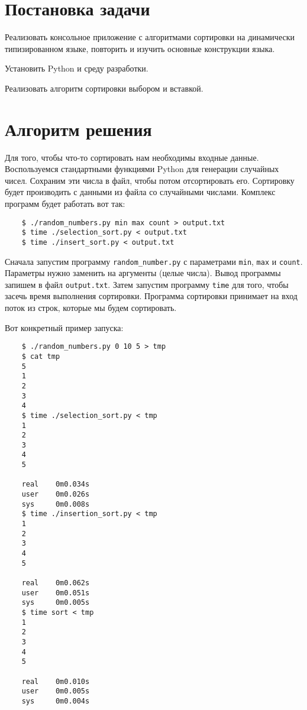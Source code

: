 \section*{Постановка задачи}
Реализовать консольное приложение с алгоритмами сортировки на динамически
типизированном языке, повторить и изучить основные конструкции языка.

Установить Python и среду разработки.

Реализовать алгоритм сортировки выбором и вставкой.

\section{Алгоритм решения}
Для того, чтобы что-то сортировать нам необходимы входные данные.
Воспользуемся стандартными функциями Python для генерации случайных чисел.
Сохраним эти числа в файл, чтобы потом отсортировать его.
Сортировку будет производить с данными из файла со случайными числами.
Комплекс программ будет работать вот так:

\begin{verbatim}
    $ ./random_numbers.py min max count > output.txt
    $ time ./selection_sort.py < output.txt
    $ time ./insert_sort.py < output.txt
\end{verbatim}

Сначала запустим программу \verb|random_number.py| с параметрами \verb|min|, \verb|max| и \verb|count|.
Параметры нужно заменить на аргументы (целые числа).
Вывод программы запишем в файл \verb|output.txt|.
Затем запустим программу \verb|time| для того, чтобы засечь время выполнения сортировки.
Программа сортировки принимает на вход поток из строк, которые мы будем сортировать.

Вот конкретный пример запуска:

\begin{verbatim}
    $ ./random_numbers.py 0 10 5 > tmp
    $ cat tmp
    5
    1
    2
    3
    4
    $ time ./selection_sort.py < tmp
    1
    2
    3
    4
    5
    
    real    0m0.034s
    user    0m0.026s
    sys     0m0.008s
    $ time ./insertion_sort.py < tmp
    1
    2
    3
    4
    5
    
    real    0m0.062s
    user    0m0.051s
    sys     0m0.005s
    $ time sort < tmp
    1
    2
    3
    4
    5
    
    real    0m0.010s
    user    0m0.005s
    sys     0m0.004s
\end{verbatim}

